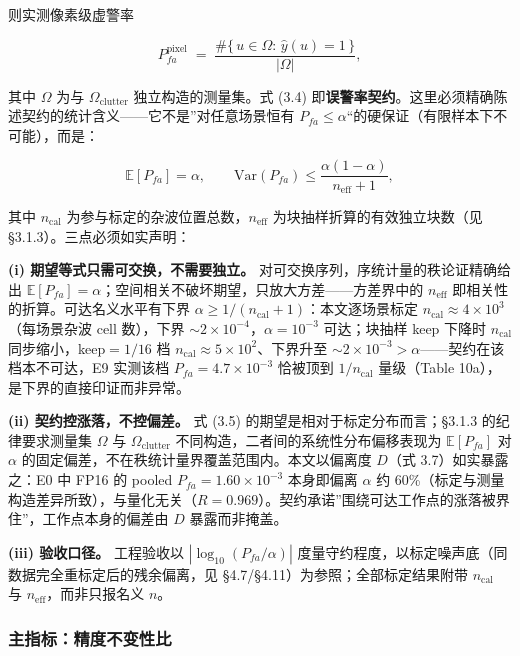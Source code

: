 则实测像素级虚警率

\[
P_{fa}^{\mathrm{pixel}} \;=\; \frac{\#\{\,u\in\Omega:\,\hat{y}(u)=1\,\}}{|\Omega|},
\tag{3.4}
\]

其中 \(\Omega\) 为与 \(\Omega_{\mathrm{clutter}}\) 独立构造的测量集。式
(3.4)
即\textbf{误警率契约}。这里必须精确陈述契约的统计含义------它不是''对任意场景恒有
\(P_{fa}\le\alpha\)``的硬保证（有限样本下不可能），而是：

\[
\mathbb{E}[P_{fa}]=\alpha,\qquad
\mathrm{Var}(P_{fa})\le \frac{\alpha(1-\alpha)}{n_{\mathrm{eff}}+1},
\tag{3.5}
\]

其中 \(n_{\mathrm{cal}}\) 为参与标定的杂波位置总数，\(n_{\mathrm{eff}}\)
为块抽样折算的有效独立块数（见 §3.1.3）。三点必须如实声明：

\textbf{(i) 期望等式只需可交换，不需要独立。}
对可交换序列，序统计量的秩论证精确给出
\(\mathbb{E}[P_{fa}]=\alpha\)；空间相关不破坏期望，只放大方差------方差界中的
\(n_{\mathrm{eff}}\) 即相关性的折算。可达名义水平有下界
\(\alpha\ge 1/(n_{\mathrm{cal}}+1)\)：本文逐场景标定
\(n_{\mathrm{cal}}\approx4\times10^{3}\)（每场景杂波 cell 数），下界
\(\sim2\times10^{-4}\)，\(\alpha=10^{-3}\) 可达；块抽样 keep 下降时
\(n_{\mathrm{cal}}\) 同步缩小，keep\(=1/16\) 档
\(n_{\mathrm{cal}}\approx5\times10^{2}\)、下界升至
\(\sim2\times10^{-3}>\alpha\)------契约在该档本不可达，E9 实测该档
\(P_{fa}=4.7\times10^{-3}\) 恰被顶到 \(1/n_{\mathrm{cal}}\) 量级（Table
10a），是下界的直接印证而非异常。

\textbf{(ii) 契约控涨落，不控偏差。} 式 (3.5)
的期望是相对于标定分布而言；§3.1.3 的纪律要求测量集 \(\Omega\) 与
\(\Omega_{\mathrm{clutter}}\) 不同构造，二者间的系统性分布偏移表现为
\(\mathbb{E}[P_{fa}]\) 对 \(\alpha\)
的固定偏差，不在秩统计量界覆盖范围内。本文以偏离度 \(D\)（式
3.7）如实暴露之：E0 中 FP16 的 pooled \(P_{fa}=1.60\times10^{-3}\)
本身即偏离 \(\alpha\) 约
60\%（标定与测量构造差异所致），与量化无关（\(R=0.969\)）。契约承诺''围绕可达工作点的涨落被界住''，工作点本身的偏差由
\(D\) 暴露而非掩盖。

\textbf{(iii) 验收口径。} 工程验收以 \(|\log_{10}(P_{fa}/\alpha)|\)
度量守约程度，以标定噪声底（同数据完全重标定后的残余偏离，见
§4.7/§4.11）为参照；全部标定结果附带 \(n_{\mathrm{cal}}\) 与
\(n_{\mathrm{eff}}\)，而非只报名义 \(n\)。

\subsubsection{主指标：精度不变性比}\label{ux4e3bux6307ux6807ux7cbeux5ea6ux4e0dux53d8ux6027ux6bd4}

